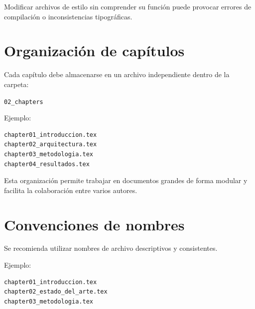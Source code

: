 \begin{warningbox}
Modificar archivos de estilo sin comprender su
función puede provocar errores de compilación
o inconsistencias tipográficas.
\end{warningbox}




\section{Organización de capítulos}

Cada capítulo debe almacenarse en un archivo
independiente dentro de la carpeta:

\texttt{02\_chapters}



Ejemplo:

\begin{lstlisting}[caption={Organización de capítulos},label={code:chapters}]
chapter01_introduccion.tex
chapter02_arquitectura.tex
chapter03_metodologia.tex
chapter04_resultados.tex
\end{lstlisting}




\begin{examplebox}
Esta organización permite trabajar en documentos
grandes de forma modular y facilita la colaboración
entre varios autores.
\end{examplebox}




\section{Convenciones de nombres}

Se recomienda utilizar nombres de archivo
descriptivos y consistentes.

Ejemplo:

\begin{lstlisting}[caption={Convención de nombres},label={code:naming}]
chapter01_introduccion.tex
chapter02_estado_del_arte.tex
chapter03_metodologia.tex
\end{lstlisting}

